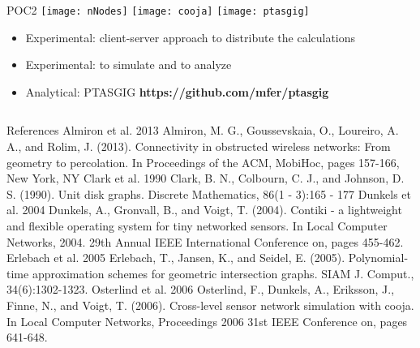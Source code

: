 \documentclass[final,hyperref={pdfpagelabels=false}]{beamer}
\begin{document}
\begin{frame}{}
\begin{columns}[t]
\begin{column}{.48\linewidth}
\begin{block}{POC2}
          \texttt{[image: nNodes]} \newline
          \texttt{[image: cooja]}
          \texttt{[image: ptasgig]}
          \begin{itemize}
          \item Experimental: client-server approach to distribute the calculations
          \item Experimental: to simulate and to analyze
          \item Analytical: PTASGIG {\bf https://github.com/mfer/ptasgig}
          \end{itemize}
        \end{block}
      \end{column}
    \end{columns}
    \begin{block}{\footnotesize References}
      \scriptsize
      {\normalsize Almiron et al. 2013} Almiron, M. G., Goussevskaia, O., Loureiro, A. A.,
        and Rolim, J. (2013). Connectivity in obstructed wireless networks: From geometry to
        percolation. In Proceedings of the ACM, MobiHoc, pages 157-166, New York, NY \newline
      {\normalsize Clark et al. 1990} Clark, B. N., Colbourn, C. J., and Johnson, D. S. (1990).
        Unit disk graphs. Discrete Mathematics, 86(1 - 3):165 - 177\newline
      {\normalsize Dunkels et al. 2004} Dunkels, A., Gronvall, B., and Voigt, T. (2004).
        Contiki - a lightweight and flexible operating system for tiny networked sensors.
        In Local Computer Networks, 2004. 29th Annual IEEE International Conference on,
        pages 455-462.\newline
      {\normalsize Erlebach et al. 2005} Erlebach, T., Jansen, K., and Seidel, E. (2005).
        Polynomial-time approximation schemes for geometric intersection graphs. SIAM J.
        Comput., 34(6):1302-1323. \newline
      {\normalsize Osterlind et al. 2006}  Osterlind, F., Dunkels, A., Eriksson, J., Finne,
        N., and Voigt, T. (2006). Cross-level sensor network simulation with cooja. In Local
        Computer Networks, Proceedings 2006 31st IEEE Conference on, pages 641-648.
    \end{block}
  \end{frame}
\end{document}
